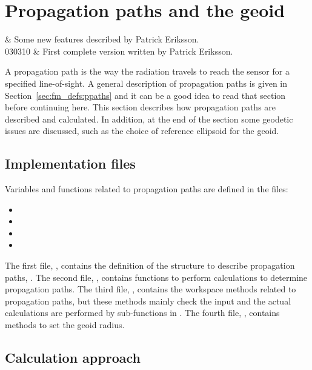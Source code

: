 \chapter{Propagation paths and the geoid}
 \label{sec:ppath}


 & Some new features described by Patrick Eriksson.\\
  030310 & First complete version written by Patrick Eriksson.\\
\stophistory



A propagation path is the way the radiation travels to reach the
sensor for a specified line-of-sight. A general description of
propagation paths is given in Section~\ref{sec:fm_defs:ppaths} and it
can be a good idea to read that section before continuing here. This
section describes how propagation paths are described and calculated.
In addition, at the end of the section some geodetic issues are
discussed, such as the choice of reference ellipsoid for the geoid.


\section{Implementation files}
Variables and functions related to propagation paths are defined in the files:
\begin{itemize}
\item {}
\item {}
\item {}
\item {}
\end{itemize}
The first file, , contains the definition of the
structure to describe propagation paths, . The
second file, , contains functions to perform
calculations to determine propagation paths. The third file,
, contains the workspace methods related to
propagation paths, but these methods mainly check the input and the
actual calculations are performed by sub-functions in
. The fourth file, ,
contains methods to set the geoid radius.




\section{Calculation approach}
\label{sec:ppath:approach}

